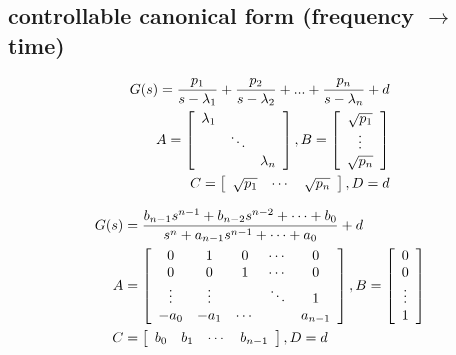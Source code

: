 \subsection{controllable canonical form (frequency $\rightarrow$ time)}
\begin{align*}
    G(s) = \frac{p_1}{s-\lambda_1} + \frac{p_2}{s-\lambda_2} + ... + \frac{p_n}{s-\lambda_n} + d\\
    A = \left[\begin{array}{c c c}
        \lambda_1 & & \\
         & \ddots & \\
         & & \lambda_n
    \end{array}\right]
    ,
    B = \left[\begin{array}{c}
        \sqrt{p_1}\\
        \vdots\\
        \sqrt{p_n}
    \end{array}\right]
    \\
    C = \left[\begin{array}{c c c}
        \sqrt{p_1} & \cdots & \sqrt{p_n}
    \end{array}\right]
    ,
    D = d
\end{align*}

\begin{align*}
    G(s) &= \frac{b_{n-1}s^{n-1} + b_{n-2}s^{n-2} + \dots + b_0}{s^n + a_{n-1}s^{n-1} + \dots + a_0} + d\\
    A &= \left[\begin{array}{c c c c c}
        0 & 1 & 0 & \cdots & 0\\
        0 & 0 & 1 & \cdots & 0\\
        \vdots & \vdots & & \ddots & 1\\
        -a_0 & -a_1 & \cdots & & a_{n-1}
    \end{array}\right]
    ,
    B = \left[\begin{array}{c}
        0\\
        0\\
        \vdots\\
        1
    \end{array}\right]
    \\
    C &= \left[\begin{array}{c c c c}
        b_0 & b_1 & \cdots & b_{n-1}
    \end{array}\right]
    ,
    D = d
\end{align*}